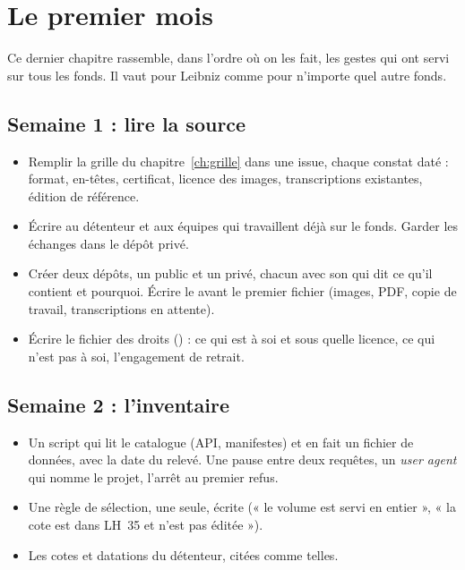 \chapter{Le premier mois}\label{ch:premier-mois}

Ce dernier chapitre rassemble, dans l'ordre où on les fait, les gestes qui ont servi sur
tous les fonds. Il vaut pour Leibniz comme pour n'importe quel autre fonds.

\section{Semaine 1 : lire la source}

\begin{itemize}
  \item Remplir la grille du chapitre~\ref{ch:grille} dans une issue, chaque constat daté :
        format, en-têtes, certificat, licence des images, transcriptions existantes,
        édition de référence.
  \item Écrire au détenteur et aux équipes qui travaillent déjà sur le fonds. Garder les
        échanges dans le dépôt privé.
  \item Créer deux dépôts, un public et un privé, chacun avec son  qui dit ce
        qu'il contient et pourquoi. Écrire le  avant le premier fichier
        (images, PDF, copie de travail, transcriptions en attente).
  \item Écrire le fichier des droits () : ce qui est à soi et sous quelle
        licence, ce qui n'est pas à soi, l'engagement de retrait.
\end{itemize}

\section{Semaine 2 : l'inventaire}

\begin{itemize}
  \item Un script qui lit le catalogue (API, manifestes) et en fait un fichier de données,
        avec la date du relevé. Une pause entre deux requêtes, un \emph{user agent} qui
        nomme le projet, l'arrêt au premier refus.
  \item Une règle de sélection, une seule, écrite (« le volume est servi en entier », « la
        cote est dans LH~35 et n'est pas éditée »).
  \item Les cotes et datations du détenteur, citées comme telles.
\end{itemize}

